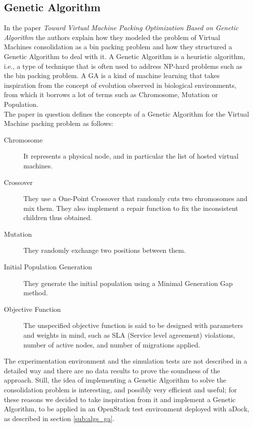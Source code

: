 \subsection{Genetic Algorithm}
\label{sec:sota_ga}
In the paper \textit{Toward Virtual Machine Packing Optimization Based on Genetic Algorithm}\cite{Nakada:2009in} the authors explain how they modeled the problem of Virtual Machines consolidation as a bin packing problem and how they structured a Genetic Algorithm to deal with it. A Genetic Algorithm is a heuristic algorithm, i.e., a type of technique that is often used to address NP-hard problems such as the bin packing problem. A GA is a kind of machine learning that takes inspiration from the concept of evolution observed in biological environments, from which it borrows a lot of terms such as Chromosome, Mutation or Population.\\
The paper in question defines the concepts of a Genetic Algorithm for the Virtual Machine packing problem as follows:
\begin{description}
  \item[Chromosome] It represents a physical node, and in particular the list of hosted virtual machines.
  \item[Crossover] They use a One-Point Crossover that randomly cuts two chromosomes and mix them. They also implement a repair function to fix the inconsistent children thus obtained.
  \item[Mutation] They randomly exchange two positions between them.
  \item[Initial Population Generation] They generate the initial population using a Minimal Generation Gap method.
  \item[Objective Function] The unspecified objective function is said to be designed with parameters and weights in mind, such as SLA (Service level agreement) violations, number of active nodes, and number of migrations applied.
\end{description}

The experimentation environment and the simulation tests are not described in a detailed way and there are no data results to prove the soundness of the approach. Still, the idea of implementing a Genetic Algorithm to solve the consolidation problem is interesting, and possibly very efficient and useful; for these reasons we decided to take inspiration from it and implement a Genetic Algorithm, to be applied in an OpenStack test environment deployed with aDock, as described in section \ref{sub:algs_ga}.

